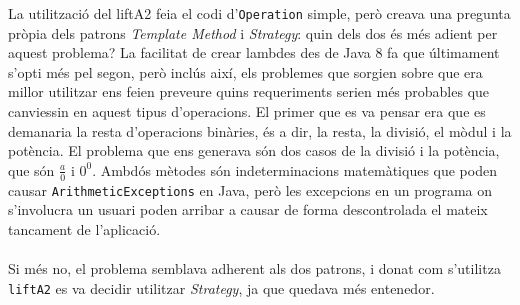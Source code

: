
	La utilització del liftA2 feia el codi d'\texttt{Operation} simple, però creava una pregunta pròpia dels patrons
	\textit{Template Method} i \textit{Strategy}: quin dels dos és més adient per aquest problema?
	 La facilitat de crear lambdes des de Java 8 fa que últimament s'opti més pel segon, però inclús així, els problemes
	 que sorgien sobre que era millor utilitzar ens feien preveure quins requeriments serien més probables 
	 que canviessin en aquest tipus d'operacions. El primer que es va pensar era que 
	 es demanaria la resta d'operacions binàries, és a dir, la resta, la divisió, el mòdul i 
	 la potència. El problema que ens generava són dos casos de la divisió i la potència, 
	 que són $\frac{a}{0}$ i $0^0$. Ambdós mètodes són indeterminacions matemàtiques que poden causar 
	 \texttt{ArithmeticExceptions} en Java, però les excepcions en un programa on s'involucra un usuari poden arribar a causar
	 de forma descontrolada el mateix tancament de l'aplicació.\\
	 \\
	 Si més  no, el problema semblava adherent als dos patrons, i donat com s'utilitza \texttt{liftA2} es va decidir utilitzar
	 \textit{Strategy},  ja que quedava més entenedor.
